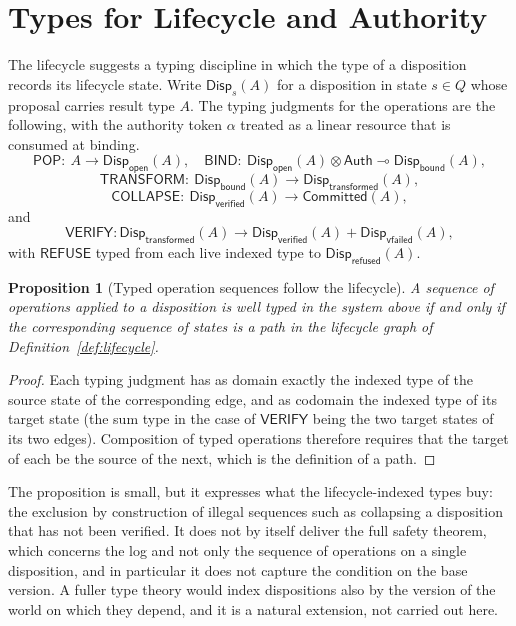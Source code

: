 \documentclass[11pt,twoside,openright]{book}
\theoremstyle{plain}
\newtheorem{proposition}[theorem]{Proposition}
\theoremstyle{definition}
\theoremstyle{remark}
\newcommand{\pop}{\mathsf{POP}}
\newcommand{\refuse}{\mathsf{REFUSE}}
\newcommand{\bind}{\mathsf{BIND}}
\newcommand{\transform}{\mathsf{TRANSFORM}}
\newcommand{\verify}{\mathsf{VERIFY}}
\newcommand{\collapse}{\mathsf{COLLAPSE}}
\begin{document}
\section{Types for Lifecycle and Authority}

The lifecycle suggests a typing discipline in which the type of a disposition records its lifecycle state. Write $\mathsf{Disp}_s(A)$ for a disposition in state $s\in Q$ whose proposal carries result type $A$. The typing judgments for the operations are the following, with the authority token $\alpha$ treated as a linear resource that is consumed at binding.
\[
\pop:\ A\to\mathsf{Disp}_{\mathsf{open}}(A),\quad
\bind:\ \mathsf{Disp}_{\mathsf{open}}(A)\otimes\mathsf{Auth}\multimap\mathsf{Disp}_{\mathsf{bound}}(A),
\]
\[
\transform:\ \mathsf{Disp}_{\mathsf{bound}}(A)\to\mathsf{Disp}_{\mathsf{transformed}}(A),
\]
\[
\collapse:\ \mathsf{Disp}_{\mathsf{verified}}(A)\to\mathsf{Committed}(A),
\]
and
\[
\verify:\mathsf{Disp}_{\mathsf{transformed}}(A)\to\mathsf{Disp}_{\mathsf{verified}}(A)+\mathsf{Disp}_{\mathsf{vfailed}}(A),
\]
with $\refuse$ typed from each live indexed type to $\mathsf{Disp}_{\mathsf{refused}}(A)$.

\begin{proposition}[Typed operation sequences follow the lifecycle]\label{prop:typed}
A sequence of operations applied to a disposition is well typed in the system above if and only if the corresponding sequence of states is a path in the lifecycle graph of Definition~\ref{def:lifecycle}.
\end{proposition}

\begin{proof}
Each typing judgment has as domain exactly the indexed type of the source state of the corresponding edge, and as codomain the indexed type of its target state (the sum type in the case of $\verify$ being the two target states of its two edges). Composition of typed operations therefore requires that the target of each be the source of the next, which is the definition of a path.
\end{proof}

The proposition is small, but it expresses what the lifecycle-indexed types buy: the exclusion by construction of illegal sequences such as collapsing a disposition that has not been verified. It does not by itself deliver the full safety theorem, which concerns the log and not only the sequence of operations on a single disposition, and in particular it does not capture the condition on the base version. A fuller type theory would index dispositions also by the version of the world on which they depend, and it is a natural extension, not carried out here.
\end{document}
